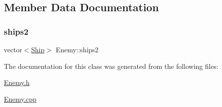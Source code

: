 \subsection{Member Data Documentation}
\mbox{\label{class_enemy_a8d89e5413c698cba1b9164eddf1bdb87}} 
\subsubsection{\texorpdfstring{ships2}{ships2}}
{\footnotesize\ttfamily vector$<$\hyperlink{class_ship}{Ship}$>$ Enemy\+::ships2}



The documentation for this class was generated from the following files\+:\begin{DoxyCompactItemize}
\item 
\hyperlink{_enemy_8h}{Enemy.\+h}\item 
\hyperlink{_enemy_8cpp}{Enemy.\+cpp}\end{DoxyCompactItemize}
